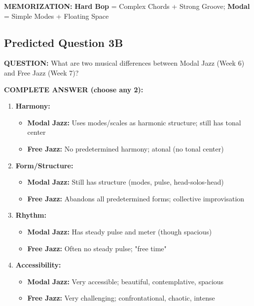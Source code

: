 \documentclass[11pt]{article}
\begin{document}
\textbf{MEMORIZATION:} \textcolor{hardbop}{\textbf{Hard Bop}} = Complex Chords + Strong Groove; \textcolor{modal}{\textbf{Modal}} = Simple Modes + Floating Space

\subsection*{Predicted Question 3B}

\begin{mdframed}[backgroundcolor=questioncolor!10, linewidth=2pt]
\textbf{\textcolor{questioncolor}{QUESTION:}} What are two musical differences between Modal Jazz (Week 6) and Free Jazz (Week 7)?
\end{mdframed}

\begin{mdframed}[backgroundcolor=answercolor!10, linewidth=2pt]
\textbf{\textcolor{answercolor}{COMPLETE ANSWER (choose any 2):}}

\begin{enumerate}[leftmargin=*, nosep]
    \item \textbf{Harmony:}
    \begin{itemize}[nosep]
        \item \textbf{Modal Jazz:} Uses modes/scales as harmonic structure; still has tonal center
        \item \textbf{Free Jazz:} No predetermined harmony; atonal (no tonal center)
    \end{itemize}
    
    \item \textbf{Form/Structure:}
    \begin{itemize}[nosep]
        \item \textbf{Modal Jazz:} Still has structure (modes, pulse, head-solos-head)
        \item \textbf{Free Jazz:} Abandons all predetermined forms; collective improvisation
    \end{itemize}
    
    \item \textbf{Rhythm:}
    \begin{itemize}[nosep]
        \item \textbf{Modal Jazz:} Has steady pulse and meter (though spacious)
        \item \textbf{Free Jazz:} Often no steady pulse; "free time"
    \end{itemize}
    
    \item \textbf{Accessibility:}
    \begin{itemize}[nosep]
        \item \textbf{Modal Jazz:} Very accessible; beautiful, contemplative, spacious
        \item \textbf{Free Jazz:} Very challenging; confrontational, chaotic, intense
    \end{itemize}
\end{enumerate}


\end{mdframed}
\end{document}
